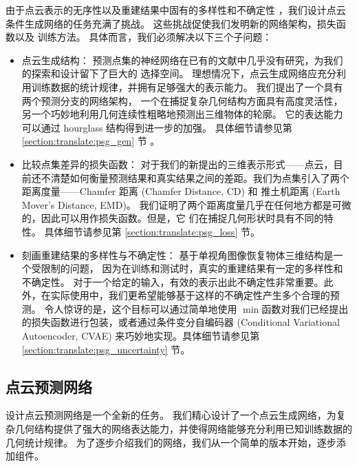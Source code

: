由于点云表示的无序性以及重建结果中固有的多样性和不确定性
，我们设计点云条件生成网络的任务充满了挑战。
这些挑战促使我们发明新的网络架构，损失函数以及%
训练方法。
具体而言，我们必须解决以下三个子问题：
\begin{itemize}
	\item {\heiti 点云生成结构}：
	      预测点集的神经网络在已有的文献中几乎没有研究，为我们的探索和设计留下了巨大的
	      选择空间。
	      理想情况下，点云生成网络应充分利用训练数据的统计规律，并拥有足够强大的表示能力。
	      我们提出了一个具有两个预测分支的网络架构，
	      一个在捕捉复杂几何结构方面具有高度灵活性，
	      另一个巧妙地利用几何连续性粗略地预测出三维物体的轮廓。
	      它的表达能力可以通过 hourglass 结构得到进一步的加强。
	      具体细节请参见第 \ref{section:translate:psg_gen} 节
	      。


	\item {\heiti 比较点集差异的损失函数}：
	      对于我们的新提出的三维表示形式——点云，目前还不清楚如何衡量预测结果和真实结果之间的差距。我们为点集引入了两个距离度量——Chamfer 距离 (Chamfer Distance, CD) 和 推土机距离 (Earth Mover's Distance, EMD)。
	      我们证明了两个距离度量几乎在任何地方都是可微的，因此可以用作损失函数。但是，它
	      们在捕捉几何形状时具有不同的特性。
	      具体细节请参见第 \ref{section:translate:psg_loss} 节。




	\item {\heiti 刻画重建结果的多样性与不确定性}：
	      基于单视角图像恢复物体三维结构是一个受限制的问题，
	      因为在训练和测试时，真实的重建结果有一定的多样性和不确定性。
	      对于一个给定的输入，有效的表示出此不确定性非常重要。此外，在实际使用中，我们更希望能够基于这样的不确定性产生多个合理的预测。
	      令人惊讶的是，这个目标可以通过简单地使用 $\min$函数对我们已经提出的损失函数进行包装，或者通过条件变分自编码器 (Conditional Variational Autoencoder, CVAE) 来巧妙地实现。具体细节请参见第 \ref{section:translate:psg_uncertainty} 节。

\end{itemize}

\subsection{点云预测网络 \label{section:translate:psg_gen}}
设计点云预测网络是一个全新的任务。
我们精心设计了一个点云生成网络，为复杂几何结构提供了强大的网络表达能力，并使得网络能够充分利用已知训练数据的几何统计规律。
为了逐步介绍我们的网络，我们从一个简单的版本开始，逐步添加组件。

